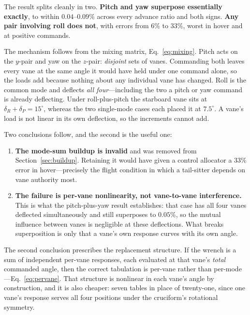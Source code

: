 \documentclass[11pt,a4paper]{article}
\newcommand{\dg}{^\circ}
\begin{document}


\noindent
The result splits cleanly in two. \textbf{Pitch and yaw superpose
essentially exactly}, to within $0.04$--$0.09\%$ across every advance
ratio and both signs. \textbf{Any pair involving roll does not},
with errors from $6\%$ to $33\%$, worst in hover and at positive
commands.

The mechanism follows from the mixing matrix, Eq.~\eqref{eq:mixing}.
Pitch acts on the $y$-pair and yaw on the $z$-pair: \emph{disjoint}
sets of vanes. Commanding both leaves every vane at the same angle it
would have held under one command alone, so the loads add because
nothing about any individual vane has changed. Roll is the common mode
and deflects \emph{all four}---including the two a pitch or yaw command
is already deflecting. Under roll-plus-pitch the starboard vane sits at
$\delta_R + \delta_P = 15\dg$, whereas the two single-mode cases each
placed it at $7.5\dg$. A vane's load is not linear in its own
deflection, so the increments cannot add.

Two conclusions follow, and the second is the useful one:

\begin{enumerate}
\item \textbf{The mode-sum buildup is invalid} and was removed from
Section~\ref{sec:buildup}. Retaining it would have given a control
allocator a $33\%$ error in hover---precisely the flight condition in
which a tail-sitter depends on vane authority most.
\item \textbf{The failure is per-vane nonlinearity, not vane-to-vane
interference.} This is what the pitch-plus-yaw result establishes: that
case has all four vanes deflected simultaneously and still superposes to
$0.05\%$, so the mutual influence between vanes is negligible at these
deflections. What breaks superposition is only that a vane's own
response curves with its own angle.
\end{enumerate}

The second conclusion prescribes the replacement structure. If the
wrench is a sum of independent per-vane responses, each evaluated at that
vane's \emph{total} commanded angle, then the correct tabulation is
per-vane rather than per-mode---Eq.~\eqref{eq:pervane}. That structure is
nonlinear in each vane's angle by construction, and it is also cheaper:
seven tables in place of twenty-one, since one vane's response serves all
four positions under the cruciform's rotational symmetry.
\end{document}
